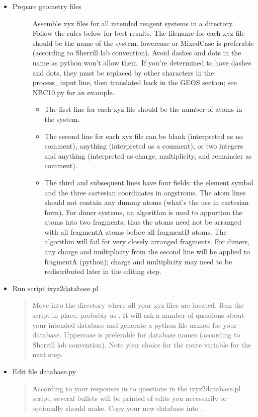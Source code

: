 \documentclass[letterpaper,10pt,english]{sphinxmanual}
\begin{document}
\begin{itemize}
\item {} \begin{description}
\item[{Prepare geometry files}] \leavevmode
Assemble xyz files for all intended reagent systems in a directory.
Follow the rules below for best results. The filename for each xyz
file should be the name of the system. lowercase or MixedCase is
preferable (according to Sherrill lab convention). Avoid dashes and
dots in the name as python won't allow them. If you're determined to
have dashes and dots, they must be replaced by other characters in the
process\_input line, then translated back in the GEOS section; see
NBC10.py for an example.
\begin{itemize}
\item {} 
The first line for each xyz file should be the number of atoms in the system.

\item {} 
The second line for each xyz file can be blank (interpreted as no comment), anything (interpreted as a comment), or two integers and anything (interpreted as charge, multiplicity, and remainder as comment).

\item {} 
The third and subsequent lines have four fields: the element symbol and the three cartesian coordinates in angstroms. The atom lines should not contain any dummy atoms (what's the use in cartesian form).  For dimer systems, an algorithm is used to apportion the atoms into two fragments; thus the atoms need not be arranged with all fragmentA atoms before all fragmentB atoms. The algorithm will fail for very closely arranged fragments. For dimers, any charge and multiplicity from the second line will be applied to fragmentA (python); charge and multiplicity may need to be redistributed later in the editing step.

\end{itemize}

\end{description}

\item {} 
Run script ixyz2database.pl
\begin{quote}

Move into the directory where all your xyz files are located. Run the
script in place, probably as
. It will ask a number of
questions about your intended database and generate a python file
named for your database. Uppercase is preferable for database names
(according to Sherrill lab convention). Note your choice for the route
variable for the next step.
\end{quote}

\item {} 
Edit file database.py
\begin{quote}

According to your responses in to questions in the ixyz2database.pl script,
several bullets will be printed of edits you necessarily or optionally
should make. Copy your new database into .
\end{quote}

\end{itemize}
\end{document}
